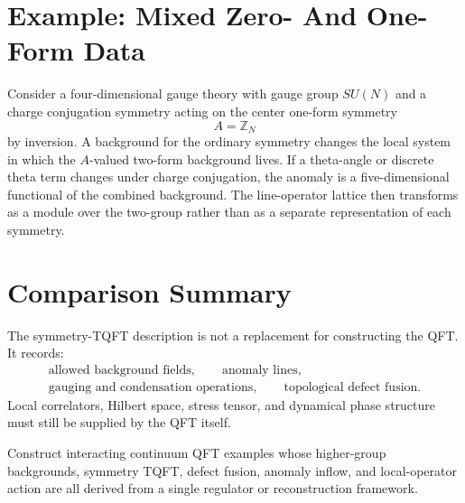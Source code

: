 \section{Example: Mixed Zero- And One-Form Data}

Consider a four-dimensional gauge theory with gauge group \(SU(N)\) and a
charge conjugation symmetry acting on the center one-form symmetry
\[
  A=\mathbb Z_N
\]
by inversion.  A background for the ordinary symmetry changes the local
system in which the \(A\)-valued two-form background lives.  If a theta-angle
or discrete theta term changes under charge conjugation, the anomaly is a
five-dimensional functional of the combined background.  The line-operator
lattice then transforms as a module over the two-group rather than as a
separate representation of each symmetry.

\section*{Comparison Summary}

The symmetry-TQFT description is not a replacement for constructing the QFT.
It records:
\[
\begin{gathered}
  \text{allowed background fields},\qquad
  \text{anomaly lines},\\
  \text{gauging and condensation operations},\qquad
  \text{topological defect fusion}.
\end{gathered}
\]
Local correlators, Hilbert space, stress tensor, and dynamical phase
structure must still be supplied by the QFT itself.

\begin{openproblem}
\label{op:higher-group-examples}
Construct interacting continuum QFT examples whose higher-group backgrounds,
symmetry TQFT, defect fusion, anomaly inflow, and local-operator action are
all derived from a single regulator or reconstruction framework.
\end{openproblem}
